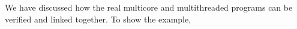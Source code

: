 
We have discussed how the real multicore and multithreaded programs 
can be verified and linked together. 
To show the example, 